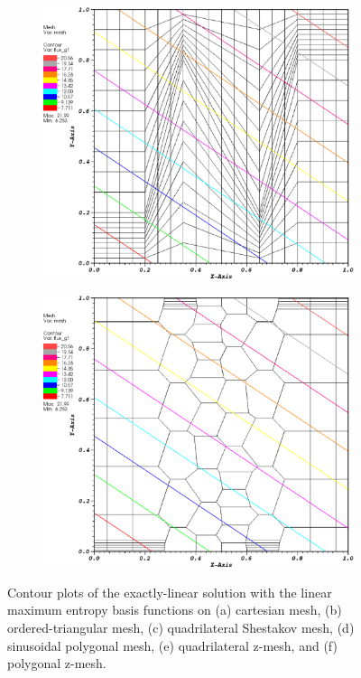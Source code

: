 \begin{figure}
\begin{subfigure}[b]{0.45\textwidth}
		\caption{}
	\end{subfigure}
	\vfill
	\begin{subfigure}[b]{0.45\textwidth}
		\centering
		\label{subfig::z_quad_me_k1_lin_sol}
		\includegraphics[width=\textwidth]{figures/sec_BF/z_quad_MAXENT_k1.eps}
		\caption{}
	\end{subfigure}
	\hfill
	\begin{subfigure}[b]{0.45\textwidth}
		\centering
		\label{subfig::z_poly_me_k1_lin_sol}
		\includegraphics[width=\textwidth]{figures/sec_BF/z_poly_MAXENT_k1.eps}
		\caption{}
	\end{subfigure}
\caption{Contour plots of the exactly-linear solution with the linear maximum entropy basis functions on (a) cartesian mesh, (b) ordered-triangular mesh, (c) quadrilateral Shestakov mesh, (d) sinusoidal polygonal mesh, (e) quadrilateral z-mesh, and (f) polygonal z-mesh.}
\label{fig::BF_Results_Linear_me1_sol}
\end{figure}


